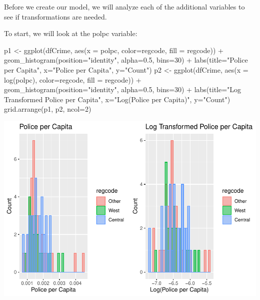 \documentclass[]{article}
\newenvironment{Shaded}{}{}
\newcommand{\DataTypeTok}[1]{#1}
\newcommand{\DecValTok}[1]{#1}
\newcommand{\FloatTok}[1]{#1}
\newcommand{\KeywordTok}[1]{\textcolor[rgb]{0.00,0.00,1.00}{#1}}
\newcommand{\NormalTok}[1]{#1}
\newcommand{\OperatorTok}[1]{#1}
\newcommand{\StringTok}[1]{\textcolor[rgb]{0.00,0.50,0.50}{#1}}
\begin{document}
Before we create our model, we will analyze each of the additional
variables to see if transformations are needed.

To start, we will look at the polpc variable:

\begin{Shaded}
\begin{Highlighting}[]
\NormalTok{p1 <-}\StringTok{ }\KeywordTok{ggplot}\NormalTok{(dfCrime, }\KeywordTok{aes}\NormalTok{(}\DataTypeTok{x =}\NormalTok{ polpc, }\DataTypeTok{color=}\NormalTok{regcode, }\DataTypeTok{fill =}\NormalTok{ regcode)) }\OperatorTok{+}
\StringTok{  }\KeywordTok{geom_histogram}\NormalTok{(}\DataTypeTok{position=}\StringTok{"identity"}\NormalTok{, }\DataTypeTok{alpha=}\FloatTok{0.5}\NormalTok{, }\DataTypeTok{bins=}\DecValTok{30}\NormalTok{) }\OperatorTok{+}
\StringTok{  }\KeywordTok{labs}\NormalTok{(}\DataTypeTok{title=}\StringTok{"Police per Capita"}\NormalTok{, }\DataTypeTok{x=}\StringTok{"Police per Capita"}\NormalTok{, }\DataTypeTok{y=}\StringTok{"Count"}\NormalTok{)}
\NormalTok{p2 <-}\StringTok{ }\KeywordTok{ggplot}\NormalTok{(dfCrime, }\KeywordTok{aes}\NormalTok{(}\DataTypeTok{x =} \KeywordTok{log}\NormalTok{(polpc), }\DataTypeTok{color=}\NormalTok{regcode, }\DataTypeTok{fill =}\NormalTok{ regcode)) }\OperatorTok{+}
\StringTok{  }\KeywordTok{geom_histogram}\NormalTok{(}\DataTypeTok{position=}\StringTok{"identity"}\NormalTok{, }\DataTypeTok{alpha=}\FloatTok{0.5}\NormalTok{, }\DataTypeTok{bins=}\DecValTok{30}\NormalTok{) }\OperatorTok{+}
\StringTok{  }\KeywordTok{labs}\NormalTok{(}\DataTypeTok{title=}\StringTok{"Log Transformed Police per Capita"}\NormalTok{, }\DataTypeTok{x=}\StringTok{"Log(Police per Capita)"}\NormalTok{, }\DataTypeTok{y=}\StringTok{"Count"}\NormalTok{)}
\KeywordTok{grid.arrange}\NormalTok{(p1, p2, }\DataTypeTok{ncol=}\DecValTok{2}\NormalTok{)}
\end{Highlighting}
\end{Shaded}

\includegraphics{Bagnard_Gaustad_Hartman_Leung_Lab_3_files/figure-latex/unnamed-chunk-65-1.pdf}
\end{document}
